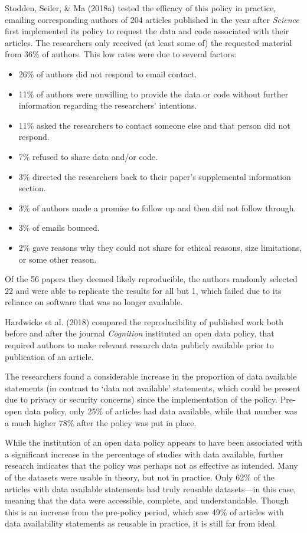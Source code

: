 \documentclass[12pt,twoside]{reedthesis}
\providecommand{\tightlist}{%
  \setlength{\itemsep}{0pt}\setlength{\parskip}{0pt}}
\begin{document}
Stodden, Seiler, \& Ma (2018a) tested the efficacy of this policy in practice, emailing corresponding authors of 204 articles published in the year after \emph{Science} first implemented its policy to request the data and code associated with their articles. The researchers only received (at least some of) the requested material from 36\% of authors. This low rates were due to several factors:
\begin{itemize}
\tightlist
\item
  26\% of authors did not respond to email contact.
\item
  11\% of authors were unwilling to provide the data or code without further information regarding the researchers' intentions.
\item
  11\% asked the researchers to contact someone else and that person did not respond.
\item
  7\% refused to share data and/or code.
\item
  3\% directed the researchers back to their paper's supplemental information section.
\item
  3\% of authors made a promise to follow up and then did not follow through.
\item
  3\% of emails bounced.
\item
  2\% gave reasons why they could not share for ethical reasons, size limitations, or some other reason.
\end{itemize}
Of the 56 papers they deemed likely reproducible, the authors randomly selected 22 and were able to replicate the results for all but 1, which failed due to its reliance on software that was no longer available.

Hardwicke et al. (2018) compared the reproducibility of published work both before and after the journal \emph{Cognition} instituted an open data policy, that required authors to make relevant research data publicly available prior to publication of an article.

The researchers found a considerable increase in the proportion of data available statements (in contrast to `data not available' statements, which could be present due to privacy or security concerns) since the implementation of the policy. Pre-open data policy, only 25\% of articles had data available, while that number was a much higher 78\% after the policy was put in place.

While the institution of an open data policy appears to have been associated with a significant increase in the percentage of studies with data available, further research indicates that the policy was perhaps not as effective as intended. Many of the datasets were usable in theory, but not in practice. Only 62\% of the articles with data available statements had truly reusable datasets---in this case, meaning that the data were accessible, complete, and understandable. Though this is an increase from the pre-policy period, which saw 49\% of articles with data availability statements as reusable in practice, it is still far from ideal.
\end{document}
